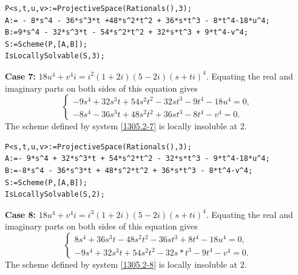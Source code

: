 \documentclass[a4paper,12pt,english,reqno]{amsart}
\begin{document}
\begin{lstlisting}
P<s,t,u,v>:=ProjectiveSpace(Rationals(),3);
A:= - 8*s^4 - 36*s^3*t +48*s^2*t^2 + 36*s*t^3 - 8*t^4-18*u^4;
B:=9*s^4 - 32*s^3*t - 54*s^2*t^2 + 32*s*t^3 + 9*t^4-v^4;
S:=Scheme(P,[A,B]);
IsLocallySolvable(S,3);
\end{lstlisting}
{\bf Case 7:} $18u^4+v^4i=i^2(1+2i)(5-2i)(s+ti)^4$. Equating the real and imaginary parts on both sides of this equation gives
\begin{equation}\label{1305.2-7}
\begin{cases}
-9s^4 + 32s^3t + 54s^2t^2 - 32st^3 - 9t^4 - 18u^4=0,\\
-8s^4 - 36s^3t + 48s^2t^2 + 36st^3 - 8t^4 - v^4=0.
\end{cases}
\end{equation}
The scheme defined by system \eqref{1305.2-7} is locally insoluble at $2$.

\begin{lstlisting}
P<s,t,u,v>:=ProjectiveSpace(Rationals(),3);
A:=- 9*s^4 + 32*s^3*t + 54*s^2*t^2 - 32*s*t^3 - 9*t^4-18*u^4;
B:=-8*s^4 - 36*s^3*t + 48*s^2*t^2 + 36*s*t^3 - 8*t^4-v^4;
S:=Scheme(P,[A,B]);
IsLocallySolvable(S,2);
\end{lstlisting}
{\bf Case 8:} $18u^4+v^4i=i^3(1+2i)(5-2i)(s+ti)^4$. Equating the real and imaginary parts on both sides of this equation gives
\begin{equation}\label{1305.2-8}
\begin{cases}
8s^4 + 36s^3t - 48s^2t^2 - 36st^3 + 8t^4 - 18u^4=0,\\
-9s^4 + 32s^3t + 54s^2t^2 - 32s*t^3 - 9t^4 - v^4=0.
\end{cases}
\end{equation}
The scheme defined by system \eqref{1305.2-8} is locally insoluble at $2$.

\end{document}
